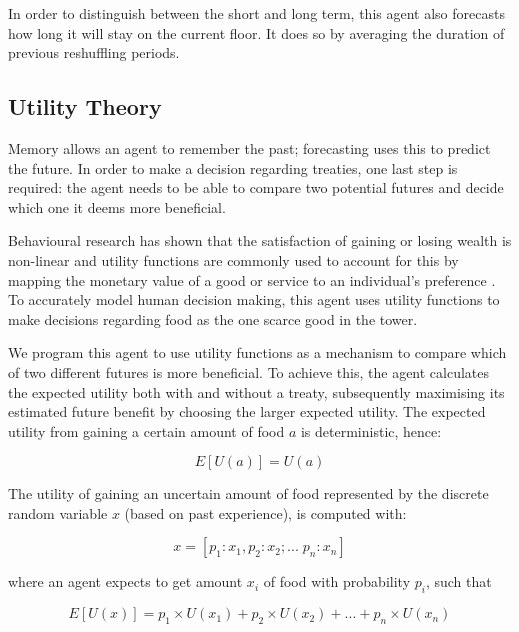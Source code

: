 In order to distinguish between the short and long term, this agent also forecasts how long it will stay on the current floor. It does so by averaging the duration of previous reshuffling periods.

\subsection{Utility Theory}

Memory allows an agent to remember the past; forecasting uses this to predict the future. In order to make a decision regarding treaties, one last step is required: the agent needs to be able to compare two potential futures and decide which one it deems more beneficial.

Behavioural research has shown that the satisfaction of gaining or losing wealth is non-linear \cite{fishburn1988nonlinear} and utility functions are commonly used to account for this by mapping the monetary value of a good or service to an individual's preference \cite{fishburn1970utility}. To accurately model human decision making, this agent uses utility functions to make decisions regarding food as the one scarce good in the tower.

We program this agent to use utility functions as a mechanism to compare which of two different futures is more beneficial. To achieve this, the agent calculates the expected utility both with and without a treaty, subsequently maximising its estimated future benefit by choosing the larger expected utility. The expected utility from gaining a certain amount of food $a$ is deterministic, hence:

\begin{equation}
    E[U(a)] = U(a) 
\end{equation}

The utility of gaining an uncertain amount of food represented by the discrete random variable $x$ (based on past experience), is computed with:

\begin{equation} 
x = [ p_1: x_1, p_2: x_2; ... \;p_n: x_n]
\end{equation}

where an agent expects to get amount $x_i$ of food with probability $p_i$, such that

\begin{equation}
E[U(x)] = p_1 \times U(x_1) + p_2 \times U(x_2) + ... + p_n \times U(x_n)
\label{eq:expectedUtility}
\end{equation}

